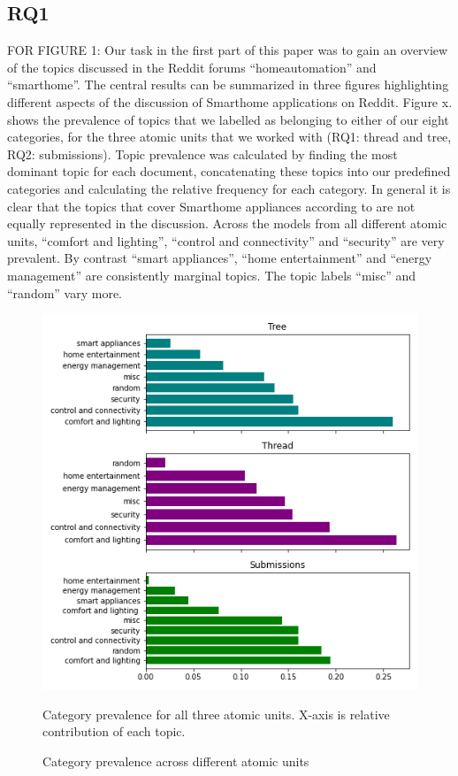 \documentclass{article}
\begin{document}
    \subsection{RQ1}
    FOR FIGURE 1: Our task in the first part of this paper was to gain an overview of the topics discussed in the Reddit forums “homeautomation” and “smarthome”. The central results can be summarized in three figures highlighting different aspects of the discussion of Smarthome applications on Reddit. Figure x. shows the prevalence of topics that we labelled as belonging to either of our eight categories, for the three atomic units that we worked with (RQ1: thread and tree, RQ2: submissions). Topic prevalence was calculated by finding the most dominant topic for each document, concatenating these topics into our predefined categories and calculating the relative frequency for each category. In general it is clear that the topics that cover Smarthome appliances according to  are not equally represented in the discussion. Across the models from all different atomic units, “comfort and lighting”, “control and connectivity” and “security” are very prevalent. By contrast “smart appliances”, “home entertainment” and “energy management” are consistently marginal topics. The topic labels “misc” and “random” vary more. 
    
    \begin{figure}[H]
        \begin{centering}
        \includegraphics[scale=0.5]{../Figure/Topic_Prevalence.png}
        \caption{Category prevalence across different atomic units}
        \end{centering}
        \begin{footnotesize} 
            Category prevalence for all three atomic units. X-axis is relative contribution of each topic. 
        \end{footnotesize}
    \end{figure}
    
\end{document}
